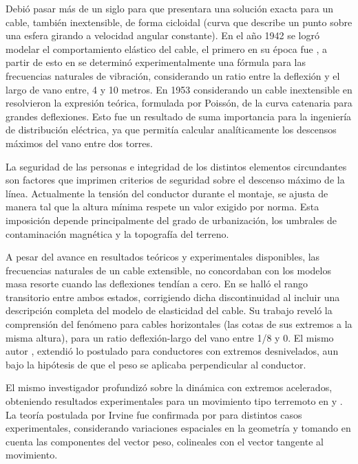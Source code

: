 Debió pasar más de un siglo para que \cite{routh1955dynamics} presentara una solución exacta para un cable, también inextensible, de forma cicloidal (curva que describe un punto sobre una esfera girando a velocidad angular constante). En el año 1942 se logró modelar el comportamiento elástico del cable, el primero en su época fue \cite{Kloppel1942}, a partir de esto en \citep{Pugsley1949} se determinó experimentalmente una fórmula para las frecuencias naturales de vibración, considerando un ratio entre la deflexión y el largo de vano entre, 4 y 10 metros. En 1953 considerando un cable inextensible en \citep{Saxon1953} resolvieron la expresión teórica, formulada por Poissón, de la curva catenaria para grandes deflexiones. Esto fue un resultado de suma importancia para la ingeniería de distribución eléctrica, ya que permitía calcular analíticamente los descensos máximos del vano entre dos torres.

La seguridad de las personas e integridad de los distintos elementos circundantes son factores que imprimen criterios de seguridad sobre el descenso máximo de la línea. Actualmente la tensión del conductor durante el montaje, se ajusta de manera tal que la altura mínima respete un valor exigido por norma. Esta imposición depende principalmente del grado de urbanización, los umbrales de contaminación magnética y la topografía del terreno.   

A pesar del avance en resultados teóricos y experimentales disponibles, las frecuencias naturales de un cable extensible, no concordaban con los modelos masa resorte cuando las deflexiones tendían a cero. En \citep{Irvine1974} se halló el rango transitorio entre ambos estados, corrigiendo dicha discontinuidad al incluir una descripción completa del modelo de elasticidad del cable. Su trabajo reveló la comprensión del fenómeno para cables horizontales (las cotas de sus extremos a la misma altura), para un ratio deflexión-largo del vano entre 1/8 y 0. El mismo autor \cite{Irvine1974}, extendió lo postulado para conductores con extremos desnivelados, aun bajo la hipótesis de que el peso se aplicaba perpendicular al conductor.

El mismo investigador profundizó sobre la dinámica con extremos acelerados, obteniendo resultados experimentales para un movimiento tipo terremoto en \citep{Irvine1976} y \citep{Irvine1978}. La teoría postulada por Irvine fue confirmada por \cite{Triantafyllou1984} para distintos casos experimentales,  considerando variaciones espaciales en la geometría y tomando en cuenta las componentes del vector peso, colineales con el vector tangente al movimiento.

